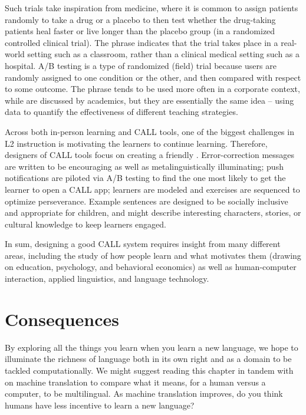 Such trials take inspiration from medicine, where it is common to  assign patients randomly to take a drug or a placebo to then test whether the drug-taking patients heal faster or live longer than the placebo group (in a randomized controlled clinical trial).  The phrase  indicates that the trial takes place in a real-world setting such as a classroom, rather than a clinical medical setting such as a hospital.  A/B testing is a type of randomized (field) trial because users are randomly assigned to one condition or the other, and then compared with respect to some outcome.  The phrase  tends to be used more often in a corporate context, while  are discussed by academics, but they are essentially the same idea -- using data to quantify the effectiveness of different teaching strategies.

Across both in-person learning and CALL tools, one of the biggest
challenges in L2 instruction is motivating the learners to continue
learning.  Therefore, designers of CALL tools focus on creating a
friendly .  Error-correction messages are
written to be encouraging as well as metalinguistically illuminating; push notifications are piloted via A/B
testing to find the one most likely to get the learner to open a CALL
app; learners are modeled and exercises are sequenced to optimize
perseverance.  Example sentences are designed to be socially inclusive
and appropriate for children, and might describe interesting characters,
stories, or cultural knowledge to keep learners engaged.

In sum, designing a good CALL system requires insight from many
different areas, including the study of how people learn and what
motivates them (drawing on education, psychology, and behavioral
economics) as well as human-computer interaction, applied linguistics,
and language technology.

\section{Consequences}

By exploring all the things you learn when you learn a new language,
we hope to illuminate the richness of language both in its own right
and as a domain to be tackled computationally.  We might suggest
reading this chapter in tandem with  on machine
translation to compare what it means, for a human versus a computer,
to be multilingual. As machine translation improves, do you think
humans have less incentive to learn a new language?

